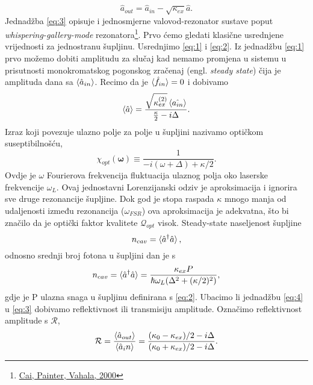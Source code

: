 \begin{equation}
	\hat{a}_{out} = \hat{a}_{in} - \sqrt{\kappa_{ex}}\hat{a}.
	\label{eq:3}
\end{equation}
Jednadžba \ref{eq:3} opisuje i jednosmjerne valovod-rezonator sustave poput \textit{whispering-gallery-mode} rezonatora\footnote{\href{https://journals.aps.org/prl/abstract/10.1103/PhysRevLett.85.74}{Cai, Painter, Vahala, 2000}}.
Prvo ćemo gledati klasične usrednjene vrijednosti za jednostranu šupljinu. Usrednjimo \ref{eq:1} i \ref{eq:2}. Iz jednadžbu \ref{eq:1} prvo možemo dobiti amplitudu za slučaj kad 
nemamo promjena u sistemu u prisutnosti monokromatskog pogonskog zračenaj (engl. \textit{steady state}) čija je amplituda dana sa $\braket{\hat{a}_{in}}$. Recimo da je $\braket{\hat{f}_{in}} = 0$ i dobivamo
\begin{equation}
	\braket{\hat{a}} = \frac{\sqrt{\kappa_{ex}^{(2)}}\braket{\hat{a_{in}}}}{\frac{\kappa}{2} - i\Delta}.
	\label{eq:4}
\end{equation}
Izraz koji povezuje ulazno polje za polje u šupljini nazivamo optičkom suseptibilnošću,
\begin{equation}
	\chi_{opt}(\mathbf{\omega}) \equiv \frac{1}{-i(\omega+\Delta)+\kappa/2}.
	\label{eq:5}
\end{equation}
Ovdje je $\omega$ Fourierova frekvencija fluktuacija ulaznog polja oko laserske frekvencije $\omega_L$. Ovaj jednostavni Lorenzijanski odziv je aproksimacija i ignorira sve druge rezonancije šupljine. 
Dok god je stopa raspada $\kappa$ mnogo manja od udaljenosti između rezonancija ($\omega_{FSR}$) ova aproksimacija je adekvatna, što bi značilo da je optički faktor kvalitete $\mathcal{Q}_{opt}$ visok. 
Steady-state naseljenost šupljine 
\begin{equation}
	n_{cav} = \braket{\hat{a}^{\dagger}\hat{a}},
	\label{eq:6}
\end{equation}
odnosno srednji broj fotona u šupljini dan je s 
\begin{equation}
	n_{cav} = \braket{\hat{a}^{\dagger}\hat{a}} = \frac{\kappa_{ex}P}{\hbar\omega_L(\Delta^2+(\kappa/2)^2)},
	\label{eq:7}
\end{equation}
gdje je P ulazna snaga u šupljinu definirana s \ref{eq:2}. Ubacimo li jednadžbu \ref{eq:4} u \ref{eq:3} dobivamo reflektivnost ili transmisiju amplitude. Označimo reflektivnost amplitude s $\mathcal{R}$,
\begin{equation}
	\mathcal{R} = \frac{\braket{\hat{a}_{out}}}{\braket{\hat{a}_in}} = \frac{(\kappa_0 -\kappa_{ex})/2 -i\Delta}{(\kappa_0 +\kappa_{ex})/2 -i\Delta}.
	\label{eq:8}
\end{equation}
